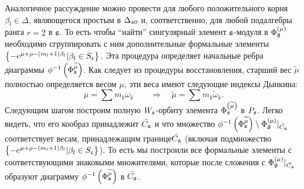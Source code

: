 Аналогичное рассуждение  можно провести для любого положительного корня $\beta _{l}\in \Delta $, являющегося простым в $\Delta _{\mathfrak{s}0}$ и, соответственно, для любой подалгебры ранга $r=2$ в $\mathfrak{s}$. То есть чтобы ``найти'' сингулярный элемент $\mathfrak{s}$-модуля в $\Phi_{\mathfrak{g}}^{\left( \mu \right) }$ необходимо сгруппировать с ним дополнительные формальные элементы  $\left\{ -e^{\mu +\rho-\left( m_{l}+1\right) \beta _{l}}|\beta _{l}\in S_{\frak{c}}\right\}.$ Эта процедура определяет начальные ребра диаграммы $\phi ^{-1}\left( \Phi _{\mathfrak{s}}^{\widetilde{\mu }}\right) $. Как следует из процедуры восстановления, старший вес $\widetilde{\mu }$ полностью определяется весом $\mu $, эти веса имеют следующие индексы Дынкина:
\begin{equation}
\mu =\sum m_{k}\omega _{k}\qquad \Longrightarrow \quad \widetilde{\mu }=\sum
m_{k}\widetilde{\omega }_{k} . \label{new h weight}
\end{equation}
Следующим шагом построим полную  $W_{\mathfrak{s}}$-орбиту элемента $\Phi _{\mathfrak{s}}^{\left( \widetilde{\mu }\right) }$  в $P_{\mathfrak{s}}$. Легко видеть, что его кообраз принадлежит  $\bar{C_{\mathfrak{a}}}$ и что множество $\phi^{-1}\left( \Phi _{\mathfrak{s}}^{\widetilde{\mu }}\right) \setminus \Phi _{\mathfrak{g}}^{\left( \mu \right) }|_{\bar{C_{\mathfrak{a}}}}$ соответствует весам, принадлежащим границе$\bar{C_{\mathfrak{a}}}$ (включая подмножество $\left\{ -e^{\mu +\rho -\left( m_{l}+1\right) \beta _{l}}|\beta _{l}\in S_{\frak{c}}\right\} $). То есть мы построили все формальные элементы с соответствующими знаковыми множителями, которые после сложения с  $\Phi _{\mathfrak{g}}^{\left( \mu \right) }|_{\bar{C_{\mathfrak{a}}}}$ образуют диаграмму $\phi^{-1}\left( \Phi _{\mathfrak{s}}^{\widetilde{\mu }}\right) $ в $\bar{C_{\mathfrak{a}}}$.

